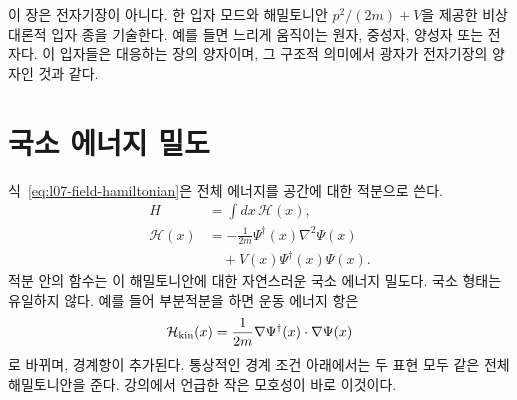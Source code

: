 이 장은 전자기장이 아니다. 한 입자 모드와 해밀토니안 \(p^2/(2m)+V\)을 제공한 비상대론적 입자 종을 기술한다. 예를 들면 느리게 움직이는 원자, 중성자, 양성자 또는 전자다. 이 입자들은 대응하는 장의 양자이며, 그 구조적 의미에서 광자가 전자기장의 양자인 것과 같다.

\begin{classroomqa}
\end{classroomqa}

\section{국소 에너지 밀도}

식~\eqref{eq:l07-field-hamiltonian}은 전체 에너지를 공간에 대한 적분으로 쓴다.
\begin{equation}
\begin{aligned}
H&=\int dx\,\mathcal H(x),\\
\mathcal H(x)
&=-\frac{1}{2m}\Psi^\dagger(x)\nabla^2\Psi(x)\\
&\quad+V(x)\Psi^\dagger(x)\Psi(x).
\end{aligned}
\label{eq:l07-hamiltonian-density}
\end{equation}
적분 안의 함수는 이 해밀토니안에 대한 자연스러운 국소 에너지 밀도다. 국소 형태는 유일하지 않다. 예를 들어 부분적분을 하면 운동 에너지 항은
\begin{equation}
\mathcal H_{\rm kin}(x)
=\frac{1}{2m}\nabla\Psi^\dagger(x)\mathbin{\cdot}\nabla\Psi(x)
\label{eq:l07-kinetic-density}
\end{equation}
로 바뀌며, 경계항이 추가된다. 통상적인 경계 조건 아래에서는 두 표현 모두 같은 전체 해밀토니안을 준다. 강의에서 언급한 작은 모호성이 바로 이것이다.

\begin{classroomqa}
\end{classroomqa}

